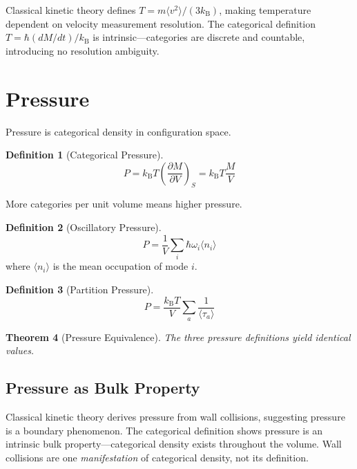 \documentclass[twocolumn,10pt]{article}
\newtheorem{theorem}{Theorem}[section]
\theoremstyle{definition}
\newtheorem{definition}[theorem]{Definition}
\theoremstyle{remark}
\newcommand{\kB}{k_{\mathrm{B}}}
\begin{document}
Classical kinetic theory defines $T = m\langle v^2\rangle/(3\kB)$, making temperature dependent on velocity measurement resolution. The categorical definition $T = \hbar(dM/dt)/\kB$ is intrinsic---categories are discrete and countable, introducing no resolution ambiguity.

\section{Pressure}
\label{sec:pressure}

Pressure is categorical density in configuration space.

\begin{definition}[Categorical Pressure]
\begin{equation}
P = \kB T \left(\frac{\partial M}{\partial V}\right)_S = \kB T \frac{M}{V}
\label{eq:categorical_pressure}
\end{equation}
\end{definition}

More categories per unit volume means higher pressure.

\begin{definition}[Oscillatory Pressure]
\begin{equation}
P = \frac{1}{V} \sum_i \hbar\omega_i \langle n_i \rangle
\label{eq:oscillatory_pressure}
\end{equation}
where $\langle n_i \rangle$ is the mean occupation of mode $i$.
\end{definition}

\begin{definition}[Partition Pressure]
\begin{equation}
P = \frac{\kB T}{V} \sum_a \frac{1}{\langle\tau_a\rangle}
\label{eq:partition_pressure}
\end{equation}
\end{definition}

\begin{theorem}[Pressure Equivalence]
The three pressure definitions yield identical values.
\end{theorem}

\subsection{Pressure as Bulk Property}

Classical kinetic theory derives pressure from wall collisions, suggesting pressure is a boundary phenomenon. The categorical definition shows pressure is an intrinsic bulk property---categorical density exists throughout the volume. Wall collisions are one \textit{manifestation} of categorical density, not its definition.
\end{document}
